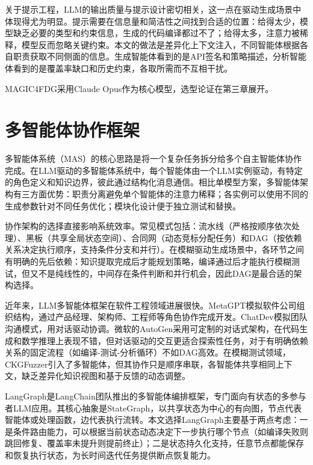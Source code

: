 关于提示工程，LLM的输出质量与提示设计密切相关\cite{shah2025}，这一点在驱动生成场景中体现得尤为明显。提示需要在信息量和简洁性之间找到合适的位置：给得太少，模型缺乏必要的类型和约束信息，生成的代码编译都过不了；给得太多，注意力被稀释，模型反而忽略关键约束。本文的做法是差异化上下文注入，不同智能体根据各自职责获取不同侧面的信息。生成智能体看到的是API签名和策略描述，分析智能体看到的是覆盖率缺口和历史约束，各取所需而不互相干扰。

MAGIC4FDG采用Claude Opus作为核心模型，选型论证在第三章展开。

\section{多智能体协作框架}

多智能体系统（MAS）的核心思路是将一个复杂任务拆分给多个自主智能体协作完成。在LLM驱动的多智能体系统中，每个智能体由一个LLM实例驱动，有特定的角色定义和知识边界，彼此通过结构化消息通信。相比单模型方案，多智能体架构有三方面优势：职责分离避免单个智能体的注意力稀释；各实例可以使用不同的生成参数针对不同任务优化；模块化设计便于独立测试和替换。


协作架构的选择直接影响系统效率。常见模式包括：流水线（严格按顺序依次处理）、黑板（共享全局状态空间）、合同网（动态竞标分配任务）和DAG（按依赖关系决定执行顺序，支持条件分支和并行）。在模糊驱动生成场景中，各环节之间有明确的先后依赖：知识提取完成后才能规划策略，编译通过后才能执行模糊测试，但又不是纯线性的，中间存在条件判断和并行机会，因此DAG是最合适的架构选择。

近年来，LLM多智能体框架在软件工程领域进展很快。MetaGPT\cite{hong2023}模拟软件公司组织结构，通过产品经理、架构师、工程师等角色协作完成开发。ChatDev\cite{qian2023}模拟团队沟通模式，用对话驱动协调。微软的AutoGen\cite{wu2023autogen}采用可定制的对话式架构，在代码生成和数学推理上表现不错，但对话驱动的交互更适合探索性任务，对于有明确依赖关系的固定流程（如编译-测试-分析循环）不如DAG高效。在模糊测试领域，CKGFuzzer\cite{xu2024}引入了多智能体，但其协作只是顺序串联，各智能体共享相同上下文，缺乏差异化知识视图和基于反馈的动态调整。

LangGraph\cite{langgraph2024}是LangChain团队推出的多智能体编排框架，专门面向有状态的多参与者LLM应用。其核心抽象是StateGraph，以共享状态为中心的有向图，节点代表智能体或处理函数，边代表执行流转。本文选择LangGraph主要基于两点考虑：一是条件路由能力，可以根据当前状态动态决定下一步执行哪个节点（如编译失败则跳回修复、覆盖率未提升则提前终止）；二是状态持久化支持，任意节点都能保存和恢复执行状态，为长时间迭代任务提供断点恢复能力。

